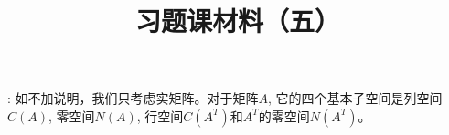 \documentclass[UTF8]{ctexart}
\begin{document}
\title{习题课材料（五）}

\date{}

\maketitle

\vspace{-1cm}


\medskip

: 如不加说明，我们只考虑实矩阵。对于矩阵$A$, 它的四个基本子空间是列空间$C(A)$, 零空间$N(A)$, 行空间$C(A^T)$和$A^T$的零空间$N(A^T)$。

\medskip
\end{document}
